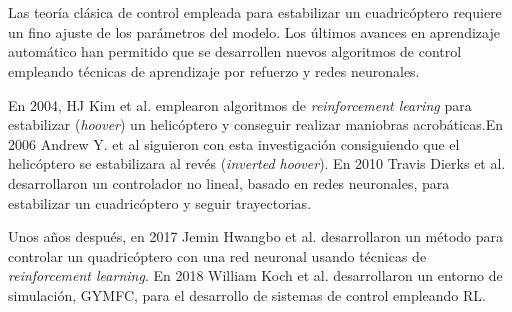 \chapter{}

Las teoría clásica de control empleada para estabilizar un cuadricóptero requiere un fino ajuste de los parámetros del modelo. Los últimos avances en aprendizaje automático han permitido que se desarrollen nuevos algoritmos de control empleando técnicas de aprendizaje por refuerzo y redes neuronales.

 En 2004, HJ Kim et al. \cite{kim2004autonomous} emplearon algoritmos de \textit{reinforcement learing} para estabilizar (\textit{hoover}) un helicóptero y conseguir realizar maniobras acrobáticas.En 2006 Andrew Y. et al \cite{ng2006autonomous} siguieron con esta investigación consiguiendo que el helicóptero se estabilizara al revés (\textit{inverted hoover}). En 2010 Travis Dierks et al. \cite{dierks2010output} desarrollaron un controlador no lineal, basado en redes neuronales, para estabilizar un cuadricóptero y seguir trayectorias.
 
 Unos años después, en 2017 Jemin Hwangbo et al. \cite{hwangbo2017control} desarrollaron un método para controlar un quadricóptero con una red neuronal usando técnicas de \textit{reinforcement learning}. En 2018 William Koch et al. \cite{koch2019reinforcement} desarrollaron un entorno de simulación, GYMFC, para el desarrollo de sistemas de control empleando RL.

